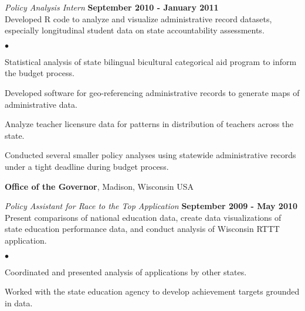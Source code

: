 \documentclass[margin,line]{res}
\newenvironment{list2}{
  \begin{list}{$\bullet$}{%
      \setlength{\itemsep}{0in}
      \setlength{\parsep}{0in} \setlength{\parskip}{0in}
      \setlength{\topsep}{0in} \setlength{\partopsep}{0in} 
      \setlength{\leftmargin}{0.2in}}}{\end{list}}
\begin{document}
\begin{resume}
\vspace{-.3cm}
{\em Policy Analysis Intern} \hfill {\bf September 2010 - January 2011}\\
Developed R code to analyze and visualize administrative record datasets, especially longitudinal student data on state accountability assessments. 
\begin{list2}
\item Statistical analysis of state bilingual bicultural categorical aid program to inform the budget process.
\item Developed software for geo-referencing administrative records to generate maps of administrative data.
\item Analyze teacher licensure data for patterns in distribution of teachers across the state.
\item Conducted several smaller policy analyses using statewide administrative records under a tight deadline during budget process.
\end{list2}

{\bf Office of the Governor}, Madison, Wisconsin USA

{\em Policy Assistant for Race to the Top Application} \hfill {\bf September 2009 - May 2010}\\
Present comparisons of national education data, create data visualizations of state education performance data, and conduct analysis of Wisconsin RTTT application. 
\begin{list2}
\item Coordinated and presented analysis of applications by other states.
\item Worked with the state education agency to develop achievement targets grounded in data.
\end{list2}


\end{resume}
\end{document}
